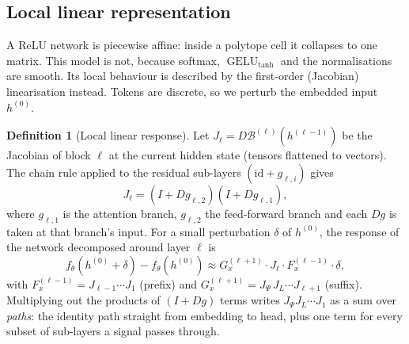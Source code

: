 \documentclass[10pt,a4paper]{article}
\newcommand{\op}[1]{\operatorname{#1}}
\theoremstyle{definition}
\newtheorem{definition}{Definition}[section]
\begin{document}
\subsection{Local linear representation}
A ReLU network is piecewise affine: inside a polytope cell it collapses to one matrix. This model is not, because softmax, $\op{GELU}_{\tanh}$ and the normalisations are smooth. Its local behaviour is described by the first-order (Jacobian) linearisation instead. Tokens are discrete, so we perturb the embedded input $h^{(0)}$.
\begin{definition}[Local linear response]
Let $J_\ell=D\mathcal{B}^{(\ell)}(h^{(\ell-1)})$ be the Jacobian of block $\ell$ at the current hidden state (tensors flattened to vectors). The chain rule applied to the residual sub-layers $(\mathrm{id}+g_{\ell,i})$ gives
\begin{equation}
  J_\ell = (I+Dg_{\ell,2})(I+Dg_{\ell,1}),
\end{equation}
where $g_{\ell,1}$ is the attention branch, $g_{\ell,2}$ the feed-forward branch and each $Dg$ is taken at that branch's input. For a small perturbation $\delta$ of $h^{(0)}$, the response of the network decomposed around layer $\ell$ is
\begin{equation}
  f_\theta(h^{(0)}+\delta)-f_\theta(h^{(0)}) \approx G^{(\ell+1)}_x\cdot J_\ell\cdot F^{(\ell-1)}_x\cdot\delta,
\end{equation}
with $F^{(\ell-1)}_x=J_{\ell-1}\cdots J_1$ (prefix) and $G^{(\ell+1)}_x=J_\Psi\,J_L\cdots J_{\ell+1}$ (suffix). Multiplying out the products of $(I+Dg)$ terms writes $J_\Psi J_L\cdots J_1$ as a sum over \emph{paths}: the identity path straight from embedding to head, plus one term for every subset of sub-layers a signal passes through.
\end{definition}
\end{document}
